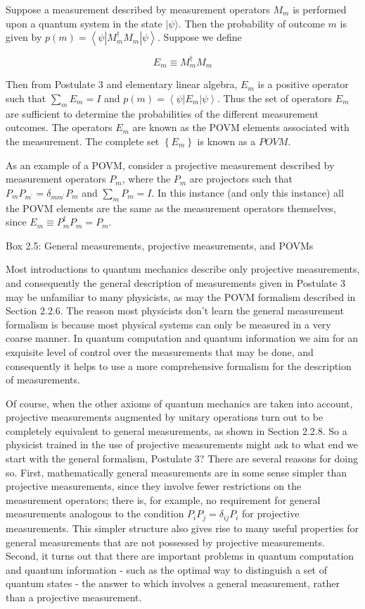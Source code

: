 \documentclass[10pt]{article}
\begin{document}
Suppose a measurement described by measurement operators $M_{m}$ is performed upon a quantum system in the state $|\psi\rangle$. Then the probability of outcome $m$ is given by $p(m)=\left\langle\psi\left|M_{m}^{\dagger} M_{m}\right| \psi\right\rangle$. Suppose we define


\begin{equation*}
E_{m} \equiv M_{m}^{\dagger} M_{m} \tag{2.117}
\end{equation*}


Then from Postulate 3 and elementary linear algebra, $E_{m}$ is a positive operator such that $\sum_{m} E_{m}=I$ and $p(m)=\left\langle\psi\left|E_{m}\right| \psi\right\rangle$. Thus the set of operators $E_{m}$ are sufficient to determine the probabilities of the different measurement outcomes. The operators $E_{m}$ are known as the POVM elements associated with the measurement. The complete set $\left\{E_{m}\right\}$ is known as a $P O V M$.

As an example of a POVM, consider a projective measurement described by measurement operators $P_{m}$, where the $P_{m}$ are projectors such that $P_{m} P_{m^{\prime}}=\delta_{m m^{\prime}} P_{m}$ and $\sum_{m} P_{m}=I$. In this instance (and only this instance) all the POVM elements are the same as the measurement operators themselves, since $E_{m} \equiv P_{m}^{\dagger} P_{m}=P_{m}$.

Box 2.5: General measurements, projective measurements, and POVMs

Most introductions to quantum mechanics describe only projective measurements, and consequently the general description of measurements given in Postulate 3 may be unfamiliar to many physicists, as may the POVM formalism described in Section 2.2.6. The reason most physicists don't learn the general measurement formalism is because most physical systems can only be measured in a very coarse manner. In quantum computation and quantum information we aim for an exquisite level of control over the measurements that may be done, and consequently it helps to use a more comprehensive formalism for the description of measurements.

Of course, when the other axioms of quantum mechanics are taken into account, projective measurements augmented by unitary operations turn out to be completely equivalent to general measurements, as shown in Section 2.2.8. So a physicist trained in the use of projective measurements might ask to what end we start with the general formalism, Postulate 3? There are several reasons for doing so. First, mathematically general measurements are in some sense simpler than projective measurements, since they involve fewer restrictions on the measurement operators; there is, for example, no requirement for general measurements analogous to the condition $P_{i} P_{j}=\delta_{i j} P_{i}$ for projective measurements. This simpler structure also gives rise to many useful properties for general measurements that are not possessed by projective measurements. Second, it turns out that there are important problems in quantum computation and quantum information - such as the optimal way to distinguish a set of quantum states - the answer to which involves a general measurement, rather than a projective measurement.
\end{document}
